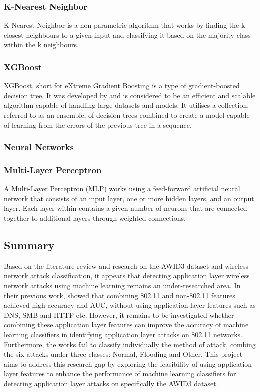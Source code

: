 \subsubsection{K-Nearest Neighbor}

K-Nearest Neighbor is a non-parametric algorithm that works by finding the k closest neighbours to a given input and classifying it based on the majority class within the k neighbours. 

\subsubsection{XGBoost}

XGBoost, short for eXtreme Gradient Boosting is a type of gradient-boosted decision tree. It was developed by \textcite{XGBoost} and is considered to be an efficient and scalable algorithm capable of handling large datasets and models. It utilises a collection, referred to as an ensemble, of decision trees combined to create a model capable of learning from the errors of the previous tree in a sequence. 

\subsubsection{Neural Networks}

\subsubsection*{Multi-Layer Perceptron}

A Multi-Layer Perceptron (MLP) works using a feed-forward artificial neural network that consists of an input layer, one or more hidden layers, and an output layer. Each layer within contains a given number of neurons that are connected together to additional layers through weighted connections. 


\subsection{Summary}

Based on the literature review and research on the AWID3 dataset and wireless network attack classification, it appears that detecting application layer wireless network attacks using machine learning remains an under-researched area. In their previous work, \textcite{s22155633} showed that combining 802.11 and non-802.11 features achieved high accuracy and AUC, without using application layer features such as DNS, SMB and HTTP etc. However, it remains to be investigated whether combining these application layer features can improve the accuracy of machine learning classifiers in identifying application layer attacks on 802.11 networks. Furthermore, the works fail to classify individually the method of attack, combing the six attacks under three classes: Normal, Flooding and Other. This project aims to address this research gap by exploring the feasibility of using application layer features to enhance the performance of machine learning classifiers for detecting application layer attacks on specifically the AWID3 dataset.